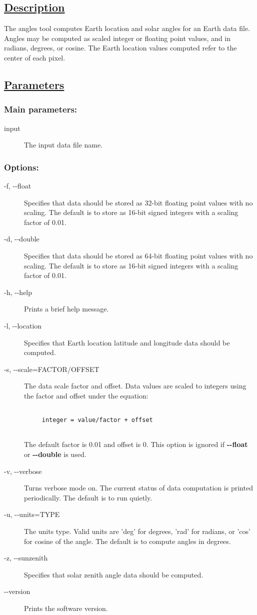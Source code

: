\subsection*{\underline{Description}}


 The angles tool computes Earth location and solar angles for an Earth data file. Angles may be computed as scaled integer or floating point values, and in radians, degrees, or cosine. The Earth location values computed refer to the center of each pixel.
\subsection*{\underline{Parameters}}
\subsubsection*{Main parameters:}
\begin{description}
\item[input]The input data file name.

\end{description}
\subsubsection*{Options:}
\begin{description}
\item[-f, -{-}float]Specifies that data should be stored as 32-bit floating point values with no scaling. The default is to store as 16-bit signed integers with a scaling factor of 0.01.
\item[-d, -{-}double]Specifies that data should be stored as 64-bit floating point values with no scaling. The default is to store as 16-bit signed integers with a scaling factor of 0.01.
\item[-h, -{-}help]Prints a brief help message.
\item[-l, -{-}location]Specifies that Earth location latitude and longitude data should be computed.
\item[-s, -{-}scale=FACTOR/OFFSET]The data scale factor and offset. Data values are scaled to integers using the factor and offset under the equation:\\ 
\begin{verbatim}

     integer = value/factor + offset
   
\end{verbatim}
 The default factor is 0.01 and offset is 0. This option is ignored if \textbf{-{-}float}
 or \textbf{-{-}double}
 is used.
\item[-v, -{-}verbose]Turns verbose mode on. The current status of data computation is printed periodically. The default is to run quietly.
\item[-u, -{-}units=TYPE]The units type. Valid units are 'deg' for degrees, 'rad' for radians, or 'cos' for cosine of the angle. The default is to compute angles in degrees.
\item[-z, -{-}sunzenith]Specifies that solar zenith angle data should be computed.
\item[-{-}version]Prints the software version.

\end{description}
